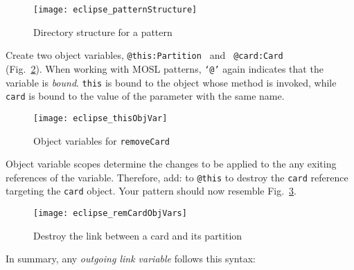 \begin{itemize}

\begin{figure}[htp]
\begin{center}
  \texttt{[image: eclipse\_patternStructure]}
  \caption{Directory structure for a pattern}
  \label{eclipse:pattStruct}
\end{center}
\end{figure}

\itemWithRightTriangle Create two object variables, \texttt{@this:Partition } and \texttt{ @card:Card}\\ (Fig.~\ref{eclipse:remCardObjVar}). When working
with MOSL patterns, \texttt{`@'} again indicates that the variable is \emph{bound}. \texttt{this} is bound to the object whose method is invoked,
while \texttt{card} is bound to the value of the parameter with the same name.


\begin{figure}[htp]
\begin{center}
  \texttt{[image: eclipse\_thisObjVar]}
  \caption{Object variables for \texttt{removeCard}}
  \label{eclipse:remCardObjVar}
\end{center}
\end{figure}

\itemWithRightTriangle Object variable scopes determine the changes to be applied to the any exiting references of the variable. Therefore, add:
 to \texttt{@this} to destroy the \texttt{card} reference targeting the \texttt{card} object. Your pattern should now resemble
Fig.~\ref{eclipse:deleteReference}. 

\begin{figure}[htp]
\begin{center}
    \texttt{[image: eclipse\_remCardObjVars]}
  \caption{Destroy the link between a card and its partition}
  \label{eclipse:deleteReference}
\end{center}
\end{figure}
\newpage

\itemWithRightTriangle In summary, any \emph{outgoing link
 variable} follows this syntax:


\end{itemize}
